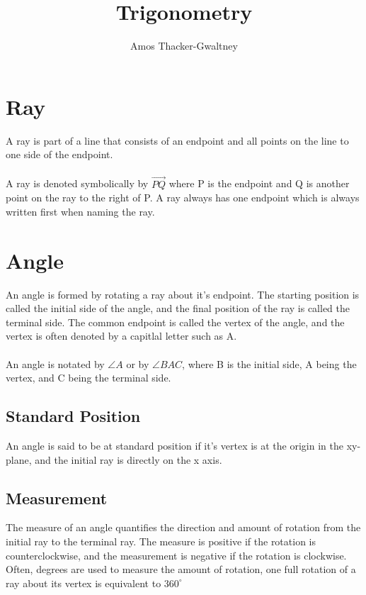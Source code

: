 \documentclass{article}
\title{Trigonometry}
\author{Amos Thacker-Gwaltney}
\begin{document}
\maketitle
\tableofcontents

\section{Ray}
A ray is part of a line that consists of an endpoint and all points on the line
to one side of the endpoint.\\\\
A ray is denoted symbolically by
$\overrightarrow{PQ}$ where P is the endpoint and Q is another point on the ray
to the right of P. A ray always has one endpoint which is always written first
when naming the ray. 


\section{Angle}
An angle is formed by rotating a ray about it's endpoint. The starting position
is called the initial side of the angle, and the final position of the ray is
called the terminal side. The common endpoint is called the vertex of the angle,
and the vertex is often denoted by a capitlal letter such as A.\\\\
An angle is
notated by $\angle{A}$ or by $\angle{BAC}$, where B is the initial side, A being the
vertex, and C being the terminal side. 

\subsection{Standard Position}
An angle is said to be at standard position if it's vertex is at the origin in
the xy-plane, and the initial ray is directly on the x axis.

\subsection{Measurement}
The measure of an angle quantifies the direction and amount of rotation from the
initial ray to the terminal ray. The measure is positive if the rotation is
counterclockwise, and the measurement is negative if the rotation is clockwise.
Often, degrees are used to measure the amount of rotation, one full rotation of
a ray about its vertex is equivalent to $360^{\circ}$
\end{document}
